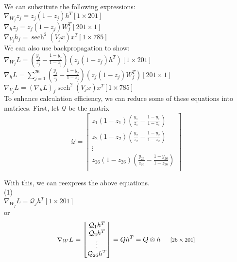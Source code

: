 \documentclass{report}
\DeclareMathOperator{\sech}{sech} %
\newcommand{\tab}{\-\hspace{0.5cm}}
\begin{document}
\-\\
We can substitute the following expressions:\\
\tab$\nabla_{W_j} z_j = z_j(1-z_j)h^T$\tab\footnotesize$[1\times201]$\normalsize\\
\tab$\nabla_{h} z_j = z_j(1-z_j)W_j^T$\tab\footnotesize$[201\times1]$\normalsize\\
\tab$\nabla_{V_j} h_j = \sech^2(V_jx)x^T $\tab\footnotesize$[1\times785]$\normalsize\\

We can also use backpropagation to show:\\
\tab$\nabla_{W_j} L = \left(\frac{y_j}{z_j} - \frac{1-y_j}{1-z_j}\right)\left(z_j(1-z_j) h^T\right)$\tab\footnotesize$[1\times201]$\normalsize\\
\tab$\nabla_{h} L = \sum_{j=1}^{26}{\left(\frac{y_j}{z_j} - \frac{1-y_j}{1-z_j}\right)\left(z_j(1-z_j)W_j^T\right)}$\tab\footnotesize$[201\times1]$\normalsize\\
\tab$\nabla_{V_j} L = \left(\nabla_{h} L\right)_j \sech^2(V_jx)x^T $\tab\footnotesize$[1\times785]$\normalsize\\

To enhance calculation efficiency, we can reduce some of these equations into matrices. First, let $\mathcal{Q}$ be the matrix
$$\mathcal{Q} = \begin{bmatrix}
z_1(1-z_1)\left(\frac{y_1}{z_1} - \frac{1-y_1}{1-z_1}\right)\\
z_2(1-z_2)\left(\frac{y_2}{z_2} - \frac{1-y_2}{1-z_2}\right)\\
\vdots \\
z_{26}(1-z_{26})\left(\frac{y_{26}}{z_{26}} - \frac{1-y_{26}}{1-z_{26}}\right)\\
\end{bmatrix}$$

With this, we can reexpress the above equations.\\
(1) \\
\tab$\nabla_{W_j} L = \mathcal{Q}_j h^T $\tab\footnotesize$[1\times201]$\normalsize\\
\tab or
$$ \nabla_{W} L = \begin{bmatrix}
\mathcal{Q}_1 h^T \\
\mathcal{Q}_2 h^T \\
\vdots \\
\mathcal{Q}_{26} h^T \\
\end{bmatrix} = Qh^T = Q \otimes h \text{\tab\footnotesize$[26\times201]$\normalsize} $$
\end{document}
